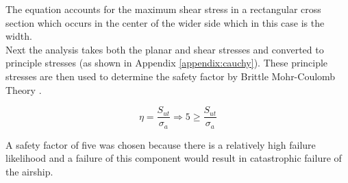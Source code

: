 \documentclass[../main.tex]{subfiles}
\begin{document}
The equation accounts for the maximum shear stress in a rectangular cross section which occurs in the center of the wider side which in this case is the width. \\ 

Next the analysis takes both the planar and shear stresses and converted to principle stresses (as shown in Appendix \ref{appendix:cauchy}). These principle stresses are then used to determine the safety factor by Brittle Mohr-Coulomb Theory \cite[227]{shigley}.

\begin{equation}
\eta = \dfrac{S_{ut}}{\sigma _a} \Rightarrow 5 \geq \dfrac{S_{ut}}{\sigma _a}
\end{equation}

A safety factor of five was chosen because there is a relatively high failure likelihood and a failure of this component would result in catastrophic failure of the airship.
\end{document}
